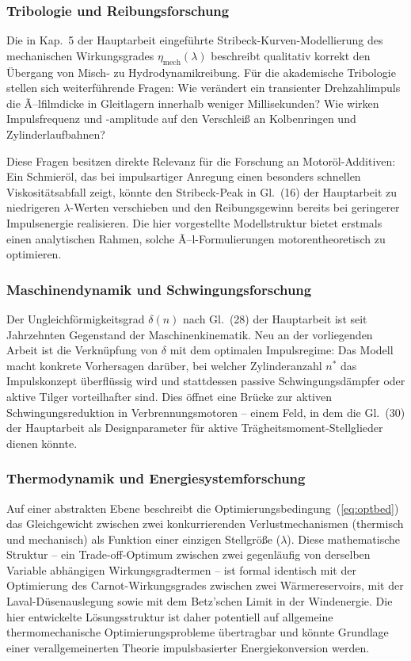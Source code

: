 ﻿\documentclass[a4paper,12pt]{article}
\begin{document}
\subsubsection{Tribologie und Reibungsforschung}

Die in Kap.~5 der Hauptarbeit eingeführte Stribeck-Kurven-Modellierung
des mechanischen Wirkungsgrades $\eta_\text{mech}(\lambda)$ beschreibt
qualitativ korrekt den Übergang von Misch- zu Hydrodynamikreibung.
Für die akademische Tribologie stellen sich weiterführende Fragen:
Wie verändert ein transienter Drehzahlimpuls die Ã–lfilmdicke in Gleitlagern
innerhalb weniger Millisekunden? Wie wirken Impulsfrequenz und -amplitude
auf den Verschleiß an Kolbenringen und Zylinderlaufbahnen?

Diese Fragen besitzen direkte Relevanz für die Forschung an Motoröl-Additiven:
Ein Schmieröl, das bei impulsartiger Anregung einen besonders schnellen
Viskositätsabfall zeigt, könnte den Stribeck-Peak in Gl.~(16) der Hauptarbeit
zu niedrigeren $\lambda$-Werten verschieben und den Reibungsgewinn bereits
bei geringerer Impulsenergie realisieren. Die hier vorgestellte Modellstruktur
bietet erstmals einen analytischen Rahmen, solche Ã–l-Formulierungen
motorentheoretisch zu optimieren.

\subsubsection{Maschinendynamik und Schwingungsforschung}

Der Ungleichförmigkeitsgrad $\delta(n)$ nach Gl.~(28) der Hauptarbeit
ist seit Jahrzehnten Gegenstand der Maschinenkinematik. Neu an der
vorliegenden Arbeit ist die Verknüpfung von $\delta$ mit dem optimalen
Impulsregime: Das Modell macht konkrete Vorhersagen darüber, bei welcher
Zylinderanzahl $n^*$ das Impulskonzept überflüssig wird und stattdessen
passive Schwingungsdämpfer oder aktive Tilger vorteilhafter sind.
Dies öffnet eine Brücke zur aktiven Schwingungsreduktion in
Verbrennungsmotoren -- einem Feld, in dem die
Gl.~(30) der Hauptarbeit als Designparameter für aktive
Trägheitsmoment-Stellglieder dienen könnte.

\subsubsection{Thermodynamik und Energiesystemforschung}

Auf einer abstrakten Ebene beschreibt die Optimierungsbedingung~(\ref{eq:optbed})
das Gleichgewicht zwischen zwei konkurrierenden Verlustmechanismen
(thermisch und mechanisch) als Funktion einer einzigen Stellgröße ($\lambda$).
Diese mathematische Struktur -- ein Trade-off-Optimum zwischen zwei
gegenläufig von derselben Variable abhängigen Wirkungsgradtermen -- ist
formal identisch mit der Optimierung des Carnot-Wirkungsgrades zwischen
zwei Wärmereservoirs, mit der Laval-Düsenauslegung sowie mit dem
Betz'schen Limit in der Windenergie. Die hier entwickelte
Lösungsstruktur ist daher potentiell auf allgemeine thermomechanische
Optimierungsprobleme übertragbar und könnte Grundlage einer verallgemeinerten
Theorie impulsbasierter Energiekonversion werden.
\end{document}
